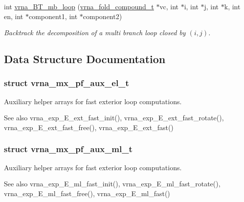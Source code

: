 \begin{DoxyCompactItemize}
int \hyperlink{group__loops_ga9cb520ddfd8b3a48089a7910b045d06b}{vrna\+\_\+\+B\+T\+\_\+mb\+\_\+loop} (\hyperlink{group__fold__compound_ga1b0cef17fd40466cef5968eaeeff6166}{vrna\+\_\+fold\+\_\+compound\+\_\+t} $\ast$vc, int $\ast$i, int $\ast$j, int $\ast$k, int en, int $\ast$component1, int $\ast$component2)
\begin{DoxyCompactList}\small\item\em Backtrack the decomposition of a multi branch loop closed by $ (i,j) $. \end{DoxyCompactList}\end{DoxyCompactItemize}


\subsection{Data Structure Documentation}
\label{structvrna__mx__pf__aux__el__t}
\subsubsection{struct vrna\+\_\+mx\+\_\+pf\+\_\+aux\+\_\+el\+\_\+t}
Auxiliary helper arrays for fast exterior loop computations. 

\begin{DoxySeeAlso}{See also}
vrna\+\_\+exp\+\_\+\+E\+\_\+ext\+\_\+fast\+\_\+init(), vrna\+\_\+exp\+\_\+\+E\+\_\+ext\+\_\+fast\+\_\+rotate(), vrna\+\_\+exp\+\_\+\+E\+\_\+ext\+\_\+fast\+\_\+free(), vrna\+\_\+exp\+\_\+\+E\+\_\+ext\+\_\+fast() 
\end{DoxySeeAlso}
\label{structvrna__mx__pf__aux__ml__t}
\subsubsection{struct vrna\+\_\+mx\+\_\+pf\+\_\+aux\+\_\+ml\+\_\+t}
Auxiliary helper arrays for fast exterior loop computations. 

\begin{DoxySeeAlso}{See also}
vrna\+\_\+exp\+\_\+\+E\+\_\+ml\+\_\+fast\+\_\+init(), vrna\+\_\+exp\+\_\+\+E\+\_\+ml\+\_\+fast\+\_\+rotate(), vrna\+\_\+exp\+\_\+\+E\+\_\+ml\+\_\+fast\+\_\+free(), vrna\+\_\+exp\+\_\+\+E\+\_\+ml\+\_\+fast() 
\end{DoxySeeAlso}


